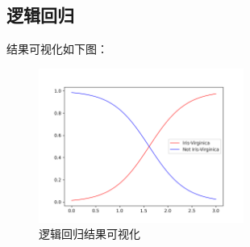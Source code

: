 \documentclass{../source/Experiment}
\begin{document}
\subsection{逻辑回归}

结果可视化如下图：
\begin{figure}[H]
    \centering
    \includegraphics[width = 0.6\textwidth]{Part2/figure3.png}
    \caption{逻辑回归结果可视化}
\end{figure}
\end{document}
